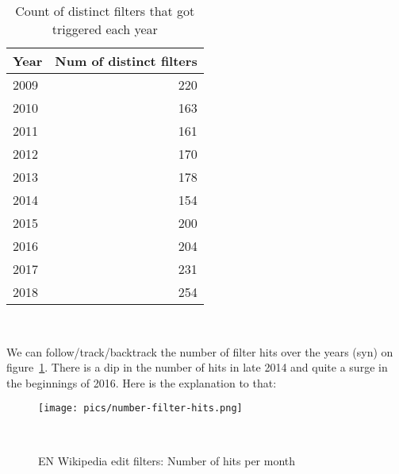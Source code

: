 \begin{table}
  \centering
  \begin{tabular}{l r }
    Year & Num of distinct filters \\
    \hline
    2009 & 220 \\
    2010 & 163 \\
    2011 & 161 \\
    2012 & 170 \\
    2013 & 178 \\
    2014 & 154 \\
    2015 & 200 \\
    2016 & 204 \\
    2017 & 231 \\
    2018 & 254 \\
  \end{tabular}
  \caption{Count of distinct filters that got triggered each year}~\label{tab:active-filters-count}
\end{table}

We can follow/track/backtrack the number of filter hits over the years (syn) on figure~\ref{fig:filter-hits}.
There is a dip in the number of hits in late 2014 and quite a surge in the beginnings of 2016.
Here is the explanation to that:
\begin{comment}
Looking at january 2016:

till now it comes to attention that a lot of accounts named something resembling <FirstnameLastname4RandomLetters> were trying to create an account  (while logged in?) (or maybe it was just that the creation of these particular accounts itself was denied); this triggers filter 527 ("T34234: log/throttle possible sleeper account creations
")
There are in the meantime over 5 pages of them, it is definitely happening automatically

TODO: download data; write script to identify actions that triggered the filters (accountcreations? edits?) and what pages were edited
Note: do hidden filters appear in this numbers and in the table? (They are definitely not displayed in the front end of the AbuseLog)
\end{comment}
\begin{figure}
\centering
  \texttt{[image: pics/number-filter-hits.png]}
  \caption{EN Wikipedia edit filters: Number of hits per month}~\label{fig:filter-hits}
\end{figure}

